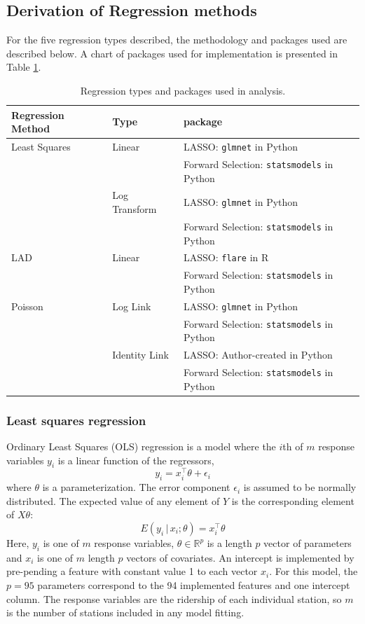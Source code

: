 \documentclass[11pt]{article}
\begin{document}
\subsection{Derivation of Regression methods}\label{sec:derive}
For the five regression types described, the methodology and packages used are described below. A chart of packages used for implementation is presented in Table \ref{tab:regtype}.

\begin{table} [H]
\centering
\begin{tabular}{lll}
\toprule Regression Method&Type&package\\
\midrule Least Squares&Linear&LASSO: \texttt{glmnet} in Python\\
&&Forward Selection: \texttt{statsmodels} in Python\\
&Log Transform&LASSO: \texttt{glmnet} in Python\\
&&Forward Selection: \texttt{statsmodels} in Python\\
LAD&Linear&LASSO: \texttt{flare} in R\\
&&Forward Selection: \texttt{statsmodels} in Python\\
Poisson&Log Link&LASSO: \texttt{glmnet} in Python\\
&&Forward Selection: \texttt{statsmodels} in Python\\
&Identity Link&LASSO: Author-created in Python\\
&&Forward Selection: \texttt{statsmodels} in Python\\
\bottomrule
\end{tabular}
\caption{Regression types and packages used in analysis.}
\label{tab:regtype}
\end{table}



\subsubsection{Least squares regression}\label{sec:lstsq}

Ordinary Least Squares (OLS) regression is a model where the $i$th of $m$ response variables $y_i$ is a linear function of the regressors,
\[y_i = x_i^\top\theta + \epsilon_i\] where $\theta$ is a parameterization. The error component $\epsilon_i$ is assumed to be normally distributed. The expected value of any element of $Y$ is the corresponding element of $X \theta$:
\[E(y_i\,|\,x_i; \theta) = x_i^\top\theta\]
Here, $y_i$ is one of $m$ response variables, $\theta\in\mathbb{R}^p$ is a length $p$ vector of parameters and $x_i$ is one of $m$ length $p$ vectors of covariates. An intercept is implemented by pre-pending a feature with constant value 1 to each vector $x_i$. For this model, the $p=95$ parameters correspond to the 94 implemented features and one intercept column. The response variables are the ridership of each individual station, so $m$ is the number of stations included in any model fitting.  
\end{document}
